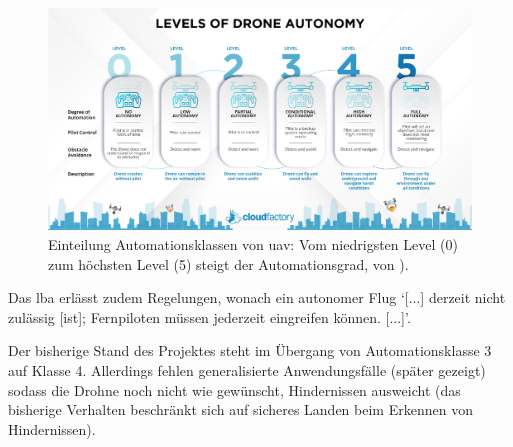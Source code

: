 \begin{figure}[!h]
	\includegraphics[width=0.7\linewidth]{images/drone_autonomy_levels.png}
	\caption[Einteilung Automationsklassen von \gls{uav}]{Einteilung Automationsklassen von \gls{uav}: Vom niedrigsten Level (0) zum höchsten Level (5) steigt der Automationsgrad, von \cite{cloudfactoryBreakingLevelsDrone}).}
	\label{fig:automation_levels}
	\end{figure}

Das \gls{lba} erlässt zudem Regelungen, wonach ein autonomer Flug \enquote*{[...] derzeit nicht zulässig [ist]; Fernpiloten müssen jederzeit eingreifen können. [...]}\cite{openuavadminDatenverbindungUndFlugmodi}.  

Der bisherige Stand des Projektes steht im Übergang von Automationsklasse 3 auf Klasse 4. Allerdings fehlen generalisierte Anwendungsfälle (später gezeigt) sodass die Drohne noch nicht wie gewünscht, Hindernissen ausweicht (das bisherige Verhalten beschränkt sich auf sicheres Landen beim Erkennen von Hindernissen).

%
%
%

